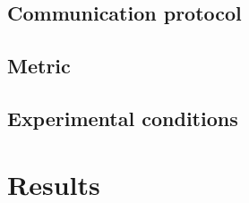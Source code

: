 \documentclass{article}
\theoremstyle{plain}
\theoremstyle{definition}
\theoremstyle{remark}
\begin{document}


\subsection*{Communication protocol}
\subsection*{Metric}

\subsection*{Experimental conditions}


\section{Results}
\label{results}
\end{document}
